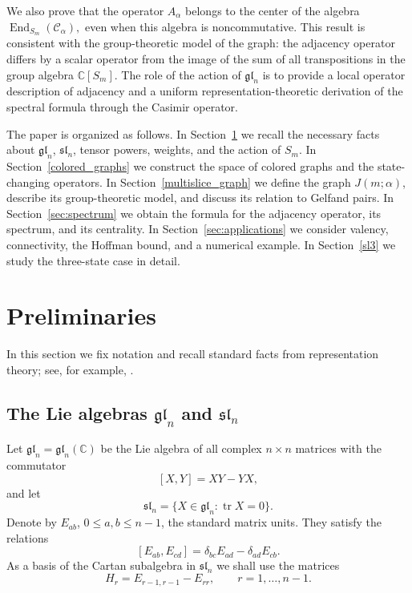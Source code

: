 \documentclass[12pt,reqno]{amsart}
\newcommand{\End}{\operatorname{End}}
\begin{document}
We also prove that the operator $A_\alpha$ belongs to the center of the
algebra
$
\End_{S_m}(\mathcal C_\alpha),
$
even when this algebra is noncommutative. This result is consistent with
the group-theoretic model of the graph: the adjacency operator differs by
a scalar operator from the image of the sum of all transpositions in the
group algebra $\mathbb C[S_m]$. The role of the action of
$\mathfrak{gl}_n$ is to provide a local operator description of adjacency
and a uniform representation-theoretic derivation of the spectral formula
through the Casimir operator.

The paper is organized as follows. In Section~\ref{preliminaries} we
recall the necessary facts about $\mathfrak{gl}_n$, $\mathfrak{sl}_n$,
tensor powers, weights, and the action of $S_m$. In
Section~\ref{colored_graphs} we construct the space of colored graphs and
the state-changing operators. In Section~\ref{multislice_graph} we define
the graph $J(m;\alpha)$, describe its group-theoretic model, and discuss
its relation to Gelfand pairs. In Section~\ref{sec:spectrum} we obtain
the formula for the adjacency operator, its spectrum, and its centrality.
In Section~\ref{sec:applications} we consider valency, connectivity, the
Hoffman bound, and a numerical example. In Section~\ref{sl3} we study the
three-state case in detail.


\section{Preliminaries}
\label{preliminaries}

In this section we fix notation and recall standard facts from
representation theory; see, for example,
\cite{Humphreys,FultonHarris,FultonYoungTableaux}.

\subsection{The Lie algebras $\mathfrak{gl}_n$ and $\mathfrak{sl}_n$}

Let $\mathfrak{gl}_n=\mathfrak{gl}_n(\mathbb C)$ be the Lie algebra of all
complex $n\times n$ matrices with the commutator
$$
[X,Y]=XY-YX,
$$
and let
$$
\mathfrak{sl}_n
=
\{X\in\mathfrak{gl}_n:\operatorname{tr}X=0\}.
$$
Denote by $E_{ab}$, $0\le a,b\le n-1$, the standard matrix units. They
satisfy the relations
\begin{equation}\label{matrix_commutator}
[E_{ab},E_{cd}]
=
\delta_{bc}E_{ad}-\delta_{ad}E_{cb}.
\end{equation}
As a basis of the Cartan subalgebra in $\mathfrak{sl}_n$ we shall use the
matrices
$$
H_r=E_{r-1,r-1}-E_{rr},
\qquad
r=1,\dots,n-1.
$$
\end{document}
